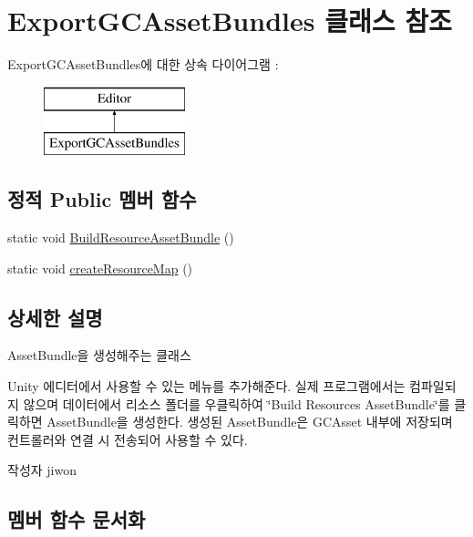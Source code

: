 \hypertarget{class_export_g_c_asset_bundles}{}\section{Export\+G\+C\+Asset\+Bundles 클래스 참조}
\label{class_export_g_c_asset_bundles}
Export\+G\+C\+Asset\+Bundles에 대한 상속 다이어그램 \+: \begin{figure}[H]
\begin{center}
\leavevmode
\includegraphics[height=2.000000cm]{class_export_g_c_asset_bundles}
\end{center}
\end{figure}
\subsection*{정적 Public 멤버 함수}
\begin{DoxyCompactItemize}
\item 
static void \hyperlink{class_export_g_c_asset_bundles_af2561e9b63a0736116171dc59bc6b0b0}{Build\+Resource\+Asset\+Bundle} ()
\item 
static void \hyperlink{class_export_g_c_asset_bundles_aef00add9b1f9bab0328302e460742b8f}{create\+Resource\+Map} ()
\end{DoxyCompactItemize}


\subsection{상세한 설명}
Asset\+Bundle을 생성해주는 클래스

Unity 에디터에서 사용할 수 있는 메뉴를 추가해준다. 실제 프로그램에서는 컴파일되지 않으며 데이터에서 리소스 폴더를 우클릭하여 \char`\"{}\+Build Resources Asset\+Bundle\char`\"{}를 클릭하면 Asset\+Bundle을 생성한다. 생성된 Asset\+Bundle은 G\+C\+Asset 내부에 저장되며 컨트롤러와 연결 시 전송되어 사용할 수 있다. \begin{DoxyAuthor}{작성자}
jiwon 
\end{DoxyAuthor}


\subsection{멤버 함수 문서화}
\hypertarget{class_export_g_c_asset_bundles_af2561e9b63a0736116171dc59bc6b0b0}{}
